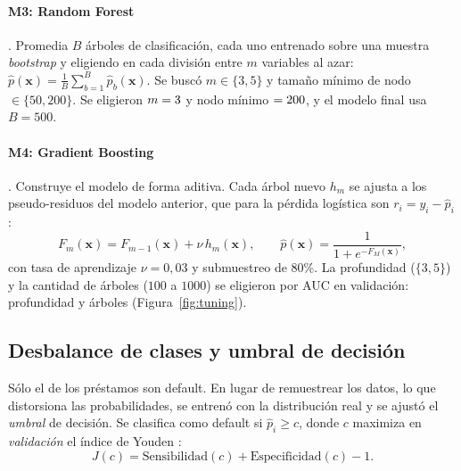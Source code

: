 \documentclass{article}
\begin{document}
\paragraph{M3: Random Forest} \cite{breiman2001,wright2017}. Promedia $B$ árboles
de clasificación, cada uno entrenado sobre una muestra \emph{bootstrap} y
eligiendo en cada división entre $m$ variables al azar:
$\hat{p}(\mathbf{x}) = \frac{1}{B}\sum_{b=1}^{B} \hat{p}_b(\mathbf{x})$. Se buscó
$m \in \{3,5\}$ y tamaño mínimo de nodo $\in \{50, 200\}$. Se eligieron $m=3$
y nodo mínimo $=200$, y el modelo final usa $B=500$.

\paragraph{M4: Gradient Boosting} \cite{friedman2001}. Construye el modelo de forma
aditiva. Cada árbol nuevo $h_m$ se ajusta a los pseudo-residuos del modelo
anterior, que para la pérdida logística son $r_i = y_i - \hat p_i$:
\begin{equation}
F_m(\mathbf{x}) = F_{m-1}(\mathbf{x}) + \nu \, h_m(\mathbf{x}), \qquad
\hat{p}(\mathbf{x}) = \frac{1}{1+e^{-F_M(\mathbf{x})}} ,
\end{equation}
con tasa de aprendizaje $\nu = 0{,}03$ y submuestreo de 80\%. La profundidad
($\{3,5\}$) y la cantidad de árboles ($100$ a $1000$) se eligieron por AUC en
validación: profundidad \gbmProf{} y \gbmArboles{} árboles
(Figura~\ref{fig:tuning}).

\subsection{Desbalance de clases y umbral de decisión}
Sólo el \tasaTotal{} de los préstamos son default. En lugar de remuestrear los
datos, lo que distorsiona las probabilidades, se entrenó con la distribución real
y se ajustó el \emph{umbral} de decisión. Se clasifica como default si
$\hat p_i \geq c$, donde $c$ maximiza en \emph{validación} el índice de Youden
\cite{youden1950}:
\begin{equation}
J(c) = \text{Sensibilidad}(c) + \text{Especificidad}(c) - 1 .
\end{equation}
\end{document}
